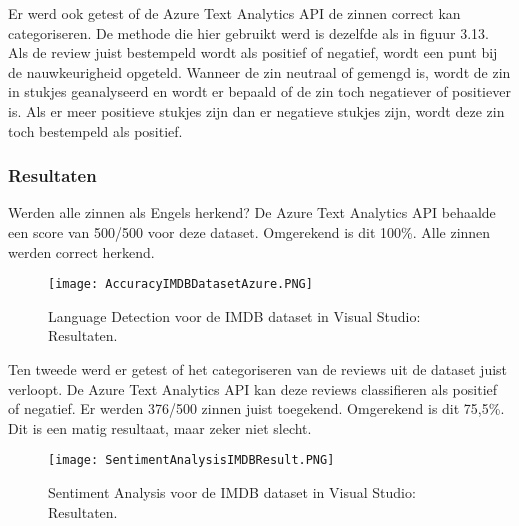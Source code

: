 Er werd ook getest of de Azure Text Analytics API de zinnen correct kan categoriseren. De methode die hier gebruikt werd is dezelfde als in figuur 3.13. Als de review juist bestempeld wordt als positief of negatief, wordt een punt bij de nauwkeurigheid opgeteld. Wanneer de zin neutraal of gemengd is, wordt de zin in stukjes geanalyseerd en wordt er bepaald of de zin toch negatiever of positiever is. Als er meer positieve stukjes zijn dan er negatieve stukjes zijn, wordt deze zin toch bestempeld als positief. 

\subsubsection{Resultaten}
\label{imdbdatasetresultatenazure}
Werden alle zinnen als Engels herkend? De Azure Text Analytics API behaalde een score van 500/500 voor deze dataset. Omgerekend is dit 100\%. Alle zinnen werden correct herkend.

\begin{figure}[!htbp]
    \texttt{[image: AccuracyIMDBDatasetAzure.PNG]}
    \caption{\label{azurelanguagedetectionimdbresults}Language Detection voor de IMDB dataset in Visual Studio: Resultaten.}
\end{figure}
\FloatBarrier 

Ten tweede werd er getest of het categoriseren van de reviews uit de dataset juist verloopt. De Azure Text Analytics API kan deze reviews classifieren als positief of negatief. Er werden 376/500 zinnen juist toegekend. Omgerekend is dit 75,5\%. Dit is een matig resultaat, maar zeker niet slecht. 
\begin{figure}[!htbp]
    \texttt{[image: SentimentAnalysisIMDBResult.PNG]}
    \caption{\label{azuresentimentanalysisimdbresults}Sentiment Analysis voor de IMDB dataset in Visual Studio: Resultaten.}
\end{figure}
\FloatBarrier 



